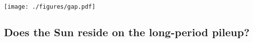 \documentclass[linenumbers,tighten,trackchanges,twocolumn]{aastex631}
\newcommand{\lamostmcq}{LAMOST--McQuillan\xspace}
\newcommand{\teff}{\ensuremath{T_{\mathrm{eff}}}\xspace}
\newcommand{\prot}{\ensuremath{P_\mathrm{rot}}\xspace}
\newcommand{\rper}{\ensuremath{R_\mathrm{per}}\xspace}
\begin{document}
\begin{figure*}
    \centering
    \texttt{[image: ./figures/gap.pdf]}
    \caption{The \teff--\prot distribution of the \lamostmcq (left) and \citet{McQuillan2014} samples color coded by the variability amplitude, \rper. Black contours show Gaussian kernel density estimation of the plotted distributions, and the dashed line shows a constant Rossby curve of Ro~=~0.5.
    The long- and short-period pile-ups are separated by a relative dearth of stars with intermediate rotation periods. A strong gradient in \rper is apparent across this gap, such that variability amplitude reaches a local minimum near the gap's center.}
    \label{fig:gap}
\end{figure*}

\subsection{Does the Sun reside on the long-period pileup?} \label{subsec:thesun}
\end{document}
